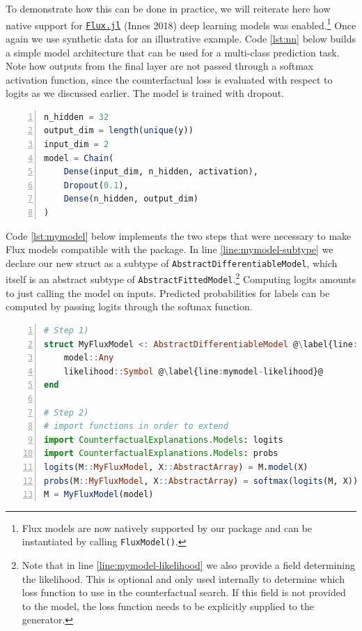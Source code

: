 \documentclass{juliacon}
\begin{document}
To demonstrate how this can be done in practice, we will reiterate here
how native support for \href{https://fluxml.ai/}{\texttt{Flux.jl}}
(Innes 2018) deep learning models was enabled.\footnote{Flux models are
  now natively supported by our package and can be instantiated by
  calling \texttt{FluxModel()}.} Once again we use synthetic data for an
illustrative example. Code \ref{lst:nn} below builds a simple model
architecture that can be used for a multi-class prediction task. Note
how outputs from the final layer are not passed through a softmax
activation function, since the counterfactual loss is evaluated with
respect to logits as we discussed earlier. The model is trained with
dropout.

\begin{lstlisting}[language=Julia, escapechar=@, numbers=left, label={lst:nn}, caption={A simple neural network model.}]
n_hidden = 32
output_dim = length(unique(y))
input_dim = 2
model = Chain(
    Dense(input_dim, n_hidden, activation),
    Dropout(0.1),
    Dense(n_hidden, output_dim)
)  
\end{lstlisting}

Code \ref{lst:mymodel} below implements the two steps that were
necessary to make Flux models compatible with the package. In line
\ref{line:mymodel-subtype} we declare our new struct as a subtype of
\texttt{AbstractDifferentiableModel}, which itself is an abstract
subtype of \texttt{AbstractFittedModel}.\footnote{Note that in line
  \ref{line:mymodel-likelihood} we also provide a field determining the
  likelihood. This is optional and only used internally to determine
  which loss function to use in the counterfactual search. If this field
  is not provided to the model, the loss function needs to be explicitly
  supplied to the generator.} Computing logits amounts to just calling
the model on inputs. Predicted probabilities for labels can be computed
by passing logits through the softmax function.

\begin{lstlisting}[language=Julia, escapechar=@, numbers=left, label={lst:mymodel}, caption={A wrapper for Flux models.}]
# Step 1)
struct MyFluxModel <: AbstractDifferentiableModel @\label{line:mymodel-subtype}@
    model::Any
    likelihood::Symbol @\label{line:mymodel-likelihood}@
end

# Step 2)
# import functions in order to extend
import CounterfactualExplanations.Models: logits
import CounterfactualExplanations.Models: probs 
logits(M::MyFluxModel, X::AbstractArray) = M.model(X)
probs(M::MyFluxModel, X::AbstractArray) = softmax(logits(M, X))
M = MyFluxModel(model)
\end{lstlisting}
\end{document}
